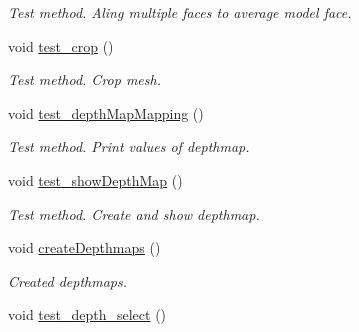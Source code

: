 \begin{DoxyCompactItemize}
\begin{DoxyCompactList}\small\item\em Test method. Aling multiple faces to average model face. \end{DoxyCompactList}\item 
\hypertarget{class_run_a71e89417c9d83e6b6e85d833f154d162}{void \hyperlink{class_run_a71e89417c9d83e6b6e85d833f154d162}{test\+\_\+crop} ()}\label{class_run_a71e89417c9d83e6b6e85d833f154d162}

\begin{DoxyCompactList}\small\item\em Test method. Crop mesh. \end{DoxyCompactList}\item 
\hypertarget{class_run_a1eef5d39477bd5d6f5faced3b95c58d8}{void \hyperlink{class_run_a1eef5d39477bd5d6f5faced3b95c58d8}{test\+\_\+depth\+Map\+Mapping} ()}\label{class_run_a1eef5d39477bd5d6f5faced3b95c58d8}

\begin{DoxyCompactList}\small\item\em Test method. Print values of depthmap. \end{DoxyCompactList}\item 
\hypertarget{class_run_aca504cde7a133e3e7ac3bb6728721678}{void \hyperlink{class_run_aca504cde7a133e3e7ac3bb6728721678}{test\+\_\+show\+Depth\+Map} ()}\label{class_run_aca504cde7a133e3e7ac3bb6728721678}

\begin{DoxyCompactList}\small\item\em Test method. Create and show depthmap. \end{DoxyCompactList}\item 
\hypertarget{class_run_a029eb27abc0ca2e5bfb59ec93496c34b}{void \hyperlink{class_run_a029eb27abc0ca2e5bfb59ec93496c34b}{create\+Depthmaps} ()}\label{class_run_a029eb27abc0ca2e5bfb59ec93496c34b}

\begin{DoxyCompactList}\small\item\em Created depthmaps. \end{DoxyCompactList}\item 
\hypertarget{class_run_a9b13e2b942026c235219644787c9ab4b}{void \hyperlink{class_run_a9b13e2b942026c235219644787c9ab4b}{test\+\_\+depth\+\_\+select} ()}\label{class_run_a9b13e2b942026c235219644787c9ab4b}


\end{DoxyCompactItemize}
